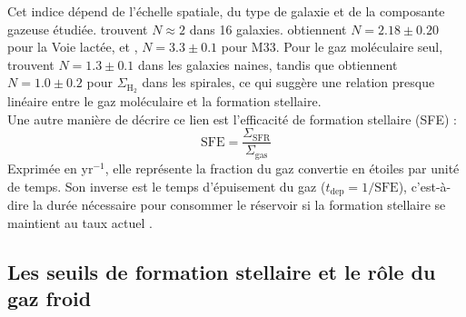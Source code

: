 Cet indice dépend de l'échelle spatiale, du type de galaxie et de la composante gazeuse étudiée. \citet{Boissier2003} trouvent $N \approx 2$ dans 16 galaxies. \citet{Misiriotis2006} obtiennent $N = 2.18 \pm 0.20$ pour la Voie lactée, et \citet{Heyer2004}, $N = 3.3 \pm 0.1$ pour M33. Pour le gaz moléculaire seul, \citet{Leroy2005} trouvent $N = 1.3 \pm 0.1$ dans les galaxies naines, tandis que \citet{Fbigiel2008} obtiennent $N = 1.0 \pm 0.2$ pour $\Sigma_{\mathrm{H}_2}$ dans les spirales, ce qui suggère une relation presque linéaire entre le gaz moléculaire et la formation stellaire.\\\indent
Une autre manière de décrire ce lien est l'efficacité de formation stellaire (SFE) :
\begin{equation}
    \mathrm{SFE} = \frac{\Sigma_{\mathrm{SFR}}}{\Sigma_{\mathrm{gas}}}
    \label{eq:sfe}
\end{equation}
\noindent Exprimée en yr$^{-1}$, elle représente la fraction du gaz convertie en étoiles par unité de temps. Son inverse est le temps d'épuisement du gaz ($t_{\mathrm{dep}} = 1/\mathrm{SFE}$), c'est-à-dire la durée nécessaire pour consommer le réservoir si la formation stellaire se maintient au taux actuel \citep{Leroy2008, Yu-Hsuan2024}.

\subsection{Les seuils de formation stellaire et le rôle du gaz froid}

